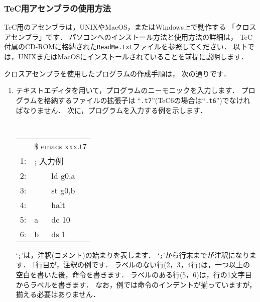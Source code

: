 \subsubsection{TeC用アセンブラの使用方法}

TeC用のアセンブラは，UNIXやMacOS，またはWindows上で動作する
「クロスアセンブラ」です．
パソコンへのインストール方法と使用方法の詳細は，
TeC付属のCD-ROMに格納された{\tt ReadMe.txt}ファイルを参照してください．
以下では，UNIXまたはMacOSにインストールされていることを前提に説明します．

クロスアセンブラを使用したプログラムの作成手順は，
次の通りです．

\begin{enumerate}
\item テキストエディタを用いて，プログラムのニーモニックを入力します．
プログラムを格納するファイルの拡張子は
``{\tt .t7}''(TeC6の場合は``{\tt .t6}'')でなければなりません．
次に，プログラムを入力する例を示します．

\begin{center}
{\footnotesize\tt
\begin{tabular}{r|l l|}
\multicolumn{1}{l}{} &\multicolumn{2}{l}{\$ emacs xxx.t7} \\
\cline{2-3}
1:  & \multicolumn{2}{|l|}{; 入力例} \\
2: &   & ld g0,a \\
3: &   & st g0,b \\
4: &   & halt \\
5: & a & dc 10   \\
6: & b & ds 1    \\
\cline{2-3}
\end{tabular}
}
\end{center}

`{\tt ;}'は，注釈(コメント)の始まりを表します．
`{\tt ;}'から行末までが注釈になります．
1行目が，注釈の例です．
ラベルのない行(2，3，4行)は，一つ以上の空白を書いた後，命令を書きます．
ラベルのある行(5，6)は，行の1文字目からラベルを書きます．
なお，例では命令のインデントが揃っていますが，
揃える必要はありません．


\end{enumerate}

